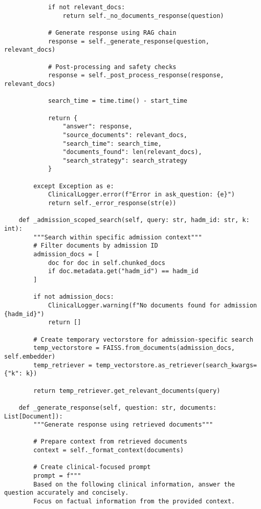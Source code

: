 \begin{verbatim}
            if not relevant_docs:
                return self._no_documents_response(question)
            
            # Generate response using RAG chain
            response = self._generate_response(question, relevant_docs)
            
            # Post-processing and safety checks
            response = self._post_process_response(response, relevant_docs)
            
            search_time = time.time() - start_time
            
            return {
                "answer": response,
                "source_documents": relevant_docs,
                "search_time": search_time,
                "documents_found": len(relevant_docs),
                "search_strategy": search_strategy
            }
        
        except Exception as e:
            ClinicalLogger.error(f"Error in ask_question: {e}")
            return self._error_response(str(e))
    
    def _admission_scoped_search(self, query: str, hadm_id: str, k: int):
        """Search within specific admission context"""
        # Filter documents by admission ID
        admission_docs = [
            doc for doc in self.chunked_docs 
            if doc.metadata.get("hadm_id") == hadm_id
        ]
        
        if not admission_docs:
            ClinicalLogger.warning(f"No documents found for admission {hadm_id}")
            return []
        
        # Create temporary vectorstore for admission-specific search
        temp_vectorstore = FAISS.from_documents(admission_docs, self.embedder)
        temp_retriever = temp_vectorstore.as_retriever(search_kwargs={"k": k})
        
        return temp_retriever.get_relevant_documents(query)
    
    def _generate_response(self, question: str, documents: List[Document]):
        """Generate response using retrieved documents"""
        
        # Prepare context from retrieved documents
        context = self._format_context(documents)
        
        # Create clinical-focused prompt
        prompt = f"""
        Based on the following clinical information, answer the question accurately and concisely.
        Focus on factual information from the provided context.
        

\end{verbatim}
